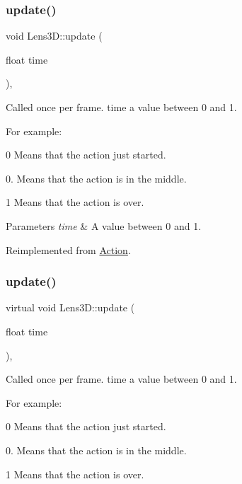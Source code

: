 \subsubsection{\texorpdfstring{update()}{update()}\hspace{0.1cm}{\footnotesize\ttfamily [1/2]}}
{\footnotesize\ttfamily void Lens3\+D\+::update (\begin{DoxyParamCaption}\item[{float}]{time }\end{DoxyParamCaption})\hspace{0.3cm}{\ttfamily [override]}, {\ttfamily [virtual]}}

Called once per frame. time a value between 0 and 1.

For example\+:
\begin{DoxyItemize}
\item 0 Means that the action just started.
\item 0. Means that the action is in the middle.
\item 1 Means that the action is over.
\end{DoxyItemize}


\begin{DoxyParams}{Parameters}
{\em time} & A value between 0 and 1. \\
\hline
\end{DoxyParams}


Reimplemented from \hyperlink{classAction_a937e646e63915e33ad05ba149bfcf239}{Action}.

\mbox{\label{classLens3D_a955fbb9a4a32528edf40388a891f73db}} 
\subsubsection{\texorpdfstring{update()}{update()}\hspace{0.1cm}{\footnotesize\ttfamily [2/2]}}
{\footnotesize\ttfamily virtual void Lens3\+D\+::update (\begin{DoxyParamCaption}\item[{float}]{time }\end{DoxyParamCaption})\hspace{0.3cm}{\ttfamily [override]}, {\ttfamily [virtual]}}

Called once per frame. time a value between 0 and 1.

For example\+:
\begin{DoxyItemize}
\item 0 Means that the action just started.
\item 0. Means that the action is in the middle.
\item 1 Means that the action is over.
\end{DoxyItemize}


